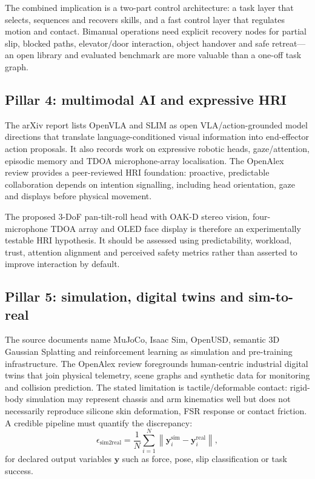 \documentclass[10pt,a4paper]{article}
\begin{document}
The combined implication is a two-part control architecture: a task layer that selects, sequences and recovers skills, and a fast control layer that regulates motion and contact. Bimanual operations need explicit recovery nodes for partial slip, blocked paths, elevator/door interaction, object handover and safe retreat---an open library and evaluated benchmark are more valuable than a one-off task graph.

\subsection{Pillar 4: multimodal AI and expressive HRI}
The arXiv report lists OpenVLA and SLIM as open VLA/action-grounded model directions that translate language-conditioned visual information into end-effector action proposals.\cite{openvla,slim} It also records work on expressive robotic heads, gaze/attention, episodic memory and TDOA microphone-array localisation.\cite{moraes,aschenbrenner} The OpenAlex review provides a peer-reviewed HRI foundation: proactive, predictable collaboration depends on intention signalling, including head orientation, gaze and displays before physical movement.\cite{li}

The proposed 3-DoF pan-tilt-roll head with OAK-D stereo vision, four-microphone TDOA array and OLED face display is therefore an experimentally testable HRI hypothesis. It should be assessed using predictability, workload, trust, attention alignment and perceived safety metrics rather than asserted to improve interaction by default.

\subsection{Pillar 5: simulation, digital twins and sim-to-real}
The source documents name MuJoCo, Isaac Sim, OpenUSD, semantic 3D Gaussian Splatting and reinforcement learning as simulation and pre-training infrastructure.\cite{ou,asad,han} The OpenAlex review foregrounds human-centric industrial digital twins that join physical telemetry, scene graphs and synthetic data for monitoring and collision prediction. The stated limitation is tactile/deformable contact: rigid-body simulation may represent chassis and arm kinematics well but does not necessarily reproduce silicone skin deformation, FSR response or contact friction. A credible pipeline must quantify the discrepancy:
\begin{equation}
\epsilon_{\mathrm{sim2real}}=\frac{1}{N}\sum_{i=1}^{N}\left\|\mathbf{y}^{\mathrm{sim}}_i-\mathbf{y}^{\mathrm{real}}_i\right\|,
\end{equation}
for declared output variables $\mathbf{y}$ such as force, pose, slip classification or task success.
\end{document}
